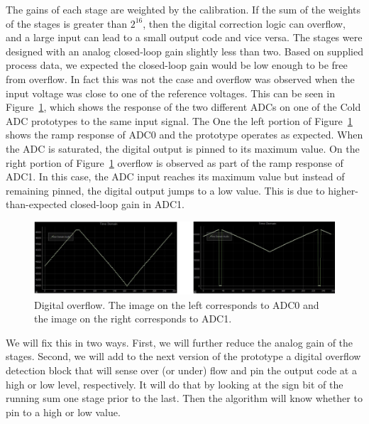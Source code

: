 \label{sec:5.9}


The gains of each stage are weighted by the calibration. If the sum of the weights of the stages is greater than $2^{16}$, then the digital correction logic can overflow, and a large input can lead to a small output code and vice versa. The stages were designed with an analog closed-loop gain slightly less than two. Based on supplied process data, we expected the closed-loop gain would be low enough to be free from overflow. In fact this was not the case and overflow was observed when the input voltage was close to one of the reference voltages. This can be seen in Figure~\ref{fig:adcoverflow}, which shows the response of the two different ADCs on one of the Cold ADC prototypes to the same input signal. The One the left portion of Figure~\ref{fig:adcoverflow} shows the ramp response of ADC0 and the prototype operates as expected. When the ADC is saturated, the digital output is pinned to its maximum value. On the right portion of Figure~\ref{fig:adcoverflow} overflow is observed as part of the ramp response of ADC1. In this case, the ADC input reaches its maximum value but instead of remaining pinned, the digital output jumps to a low value. This is due to higher-than-expected closed-loop gain in ADC1.
\begin{figure}[htb]
\centering
\begin{center}
\includegraphics[width=1.0\textwidth]{figures/ADCOverflow.png}
\end{center}
\caption{Digital overflow. The image on the left corresponds to ADC0 and the image on the right corresponds to ADC1.}
\label{fig:adcoverflow}
\end{figure}

We will fix this in two ways. First, we will further reduce the analog gain of the stages. Second, we will add to the next version of the prototype a digital overflow detection block that will sense over (or under) flow and pin the output code at a high or low level, respectively. It will do that by looking at the sign bit of the running sum one stage prior to the last. Then the algorithm will know whether to pin to a high or low value.
